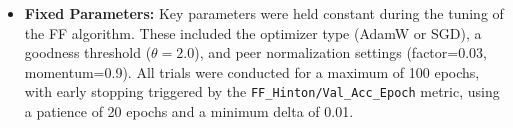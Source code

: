 \documentclass[11pt, english]{article}
\begin{document}
\begin{itemize}
\begin{itemize}
\begin{itemize}
                 \end{itemize}
             \item FF (MNIST 3x1000 MLP, AdamW):
                 \begin{itemize}
                     \item \texttt{ff\_learning\_rate}: 0.0004759134394296565
                     \item \texttt{ff\_weight\_decay}: 0.0004169096909947932
                     \item \texttt{downstream\_learning\_rate}: 0.010727571797342173
                     \item \texttt{downstream\_weight\_decay}: 0.0061527185182837065
                 \end{itemize}
             \item FF (MNIST 4x2000 MLP, AdamW):
                 \begin{itemize}
                     \item \texttt{ff\_learning\_rate}: 0.0005253511034001832
                     \item \texttt{ff\_weight\_decay}: 0.0004227844165066995
                     \item \texttt{downstream\_learning\_rate}: 0.0027075510107757122
                     \item \texttt{downstream\_weight\_decay}: 0.0035730744916099627
                 \end{itemize}
        \end{itemize}
     \item \textbf{Fixed Parameters:} Key parameters were held constant during the tuning of the FF algorithm. These included the optimizer type (AdamW or SGD), a goodness threshold ($\theta=2.0$), and peer normalization settings (factor=0.03, momentum=0.9). All trials were conducted for a maximum of 100 epochs, with early stopping triggered by the \texttt{FF\_Hinton/Val\_Acc\_Epoch} metric, using a patience of 20 epochs and a minimum delta of 0.01.
\end{itemize}
\end{document}
